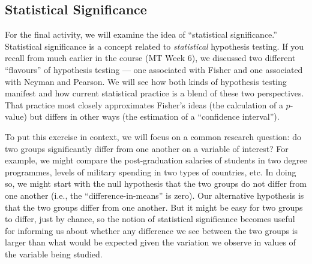 \documentclass[a4paper,12pt]{article}
\begin{document}
\subsection{Statistical Significance}

\begin{enumerate*}

\item For the final activity, we will examine the idea of ``statistical significance.'' Statistical significance is a concept related to \textit{statistical} hypothesis testing. If you recall from much earlier in the course (MT Week 6), we discussed two different ``flavours'' of hypothesis testing --- one associated with Fisher and one associated with Neyman and Pearson. We will see how both kinds of hypothesis testing manifest and how current statistical practice is a blend of these two perspectives. That practice most closely approximates Fisher's ideas (the calculation of a $p$-value) but differs in other ways (the estimation of a ``confidence interval'').

To put this exercise in context, we will focus on a common research question: do two groups significantly differ from one another on a variable of interest? For example, we might compare the post-graduation salaries of students in two degree programmes, levels of military spending in two types of countries, etc. In doing so, we might start with the null hypothesis that the two groups do not differ from one another (i.e., the ``difference-in-means'' is zero). Our alternative hypothesis is that the two groups differ from one another. But it might be easy for two groups to differ, just by chance, so the notion of statistical significance becomes useful for informing us about whether any difference we see between the two groups is larger than what would be expected given the variation we observe in values of the variable being studied.


\end{enumerate*}
\end{document}
